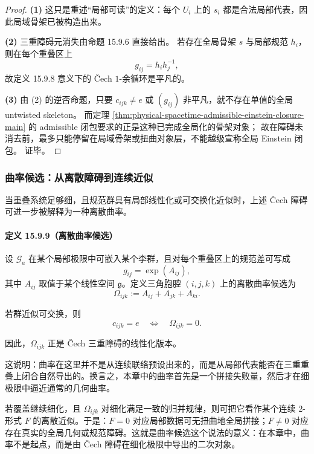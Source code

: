 \begin{proof}
\textbf{(1)} 这只是重述“局部可读”的定义：每个 \(U_i\) 上的 \(s_i\) 都是合法局部代表，因此局域骨架已被构造出来。

\textbf{(2)} 三重障碍元消失由命题 15.9.6 直接给出。
若存在全局骨架 \(s\) 与局部规范 \(h_i\)，则在每个重叠区上
\[
g_{ij}=h_i h_j^{-1},
\]
故定义 15.9.8 意义下的 Čech \(1\)-余循环是平凡的。

\textbf{(3)} 由 (2) 的逆否命题，只要 \(c_{ijk}\neq e\) 或 \((g_{ij})\) 非平凡，就不存在单值的全局 untwisted skeleton。
而定理 \ref{thm:physical-spacetime-admissible-einstein-closure-main} 的 admissible 闭包要求的正是这种已完成全局化的骨架对象；
故在障碍未消去前，最多只能停留在局域骨架或扭曲对象层，不能越级宣称全局 Einstein 闭包。
证毕。
\end{proof}

\subsubsection{曲率候选：从离散障碍到连续近似}

当重叠系统足够细，且规范群具有局部线性化或可交换化近似时，上述 Čech 障碍可进一步被解释为一种离散曲率。

\paragraph{定义 15.9.9（离散曲率候选）}
设 \(\mathscr G_a\) 在某个局部极限中可嵌入某个李群，且对每个重叠区上的规范差可写成
\[
g_{ij}=\exp(A_{ij}),
\]
其中 \(A_{ij}\) 取值于某个线性空间 \(\mathfrak g\)。定义三角胞腔 \((i,j,k)\) 上的离散曲率候选为
\[
\Omega_{ijk}:=
A_{ij}+A_{jk}+A_{ki}.
\]

若群近似可交换，则
\[
c_{ijk}=e
\quad\Longleftrightarrow\quad
\Omega_{ijk}=0.
\]

因此，\(\Omega_{ijk}\) 正是 Čech 三重障碍的线性化版本。

这说明：曲率在这里并不是从连续联络预设出来的，而是从局部代表能否在三重重叠上闭合自然导出的。换言之，本章中的曲率首先是一个拼接失败量，然后才在细极限中逼近通常的几何曲率。

若覆盖继续细化，且 \(\Omega_{ijk}\) 对细化满足一致的归并规律，则可把它看作某个连续 \(2\)-形式 \(F\) 的离散近似。于是：\(F=0\) 对应局部数据可无扭曲地全局拼接；\(F\neq 0\) 对应存在真实的全局几何或规范障碍。这就是曲率候选这个说法的意义：在本章中，曲率不是起点，而是由 Čech 障碍在细化极限中导出的二次对象。

